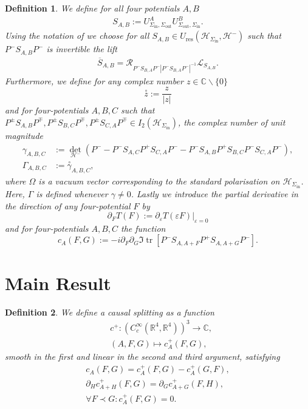 \documentclass[a4paper,11pt]{article}
\newtheorem{de}{Definition}
\DeclareMathOperator{\tr}{tr}
\begin{document}
\begin{de}
We define for all four potentials \(A,B \)
\begin{align}
S_{A,B}:=U^{A}_{\Sigma_{\mathrm{in}},\Sigma_{\mathrm{out}}}U^{B}_{\Sigma_{\mathrm{out}},\Sigma_{\mathrm{in}}}.
\end{align}
Using the notation of \cite{ivp0,ivp2} we choose for all \(S_{A,B}\in U_{\mathrm{res}}(\mathcal{H}_{\Sigma_{\mathrm{in}}},\mathcal{H}^-)\)
such that \(P^- S_{A,B}P^-\) is invertible the lift
\begin{align}
\overline{S}_{A,B}=\mathcal{R}_{P^- S_{B,A}P^- |P^- S_{B,A}P^-|^{-1}} \mathcal{L}_{S_{A,B}}.
\end{align}
Furthermore, we define for any complex number \(z\in \mathbb{C}\backslash \{0\}\)
\begin{equation}
\overset{\circ}{z}:=\frac{z}{|z|}
\end{equation}
and for four-potentials \(A,B,C\) such that \(P^{\pm} S_{A,B}P^{\mp},P^{\pm} S_{B,C}P^{\mp},P^{\pm} S_{C,A}P^{\mp}\in I_2(\mathcal{H}_{\Sigma_{\mathrm{in}}})\),
 the complex number of unit magnitude
\begin{align}
\gamma_{A,B,C}&:=\det_{\mathcal{H}^-}(P^--P^-S_{A,C}P^+S_{C,A}P^- - P^- S_{A,B} P^+ S_{B,C} P^- S_{C,A} P^-),\\
\Gamma_{A,B,C}&:=\overset{\circ}{\gamma}_{A,B,C},
\end{align}
where \(\Omega\) is a vacuum vector corresponding to the standard polarisation on \(\mathcal{H}_{{\Sigma}_{\mathrm{in}}}\).
Here, \(\Gamma\) is defined whenever \(\gamma\neq 0\).
Lastly we introduce the partial derivative in the direction of any four-potential \(F\) by
\begin{equation}
\partial_F T(F):=\partial_{\varepsilon}T(\varepsilon F)|_{\varepsilon =0}
\end{equation}
and for four-potentials \(A,B,C\) the function
\begin{equation}
c_A(F,G):=-i \partial_F \partial_G  \Im \tr [P^- S_{A,A+F} P^+ S_{A,A+G} P^-] .
\end{equation}
\end{de}

\section{Main Result}


\begin{de}
We define a causal splitting as a function 
\begin{align}
&c^+:(C_c^\infty(\mathbb{R}^4,\mathbb{R}^4))^3\rightarrow \mathbb{C}, \\
&(A,F,G)\mapsto c_A^+(F,G),
\end{align}
smooth in the first and linear in the second and third argument, satisfying
\begin{align}\label{c+ 1}
c_A(F,G)=c_A^+(F,G)-c_A^+(G,F),\\\label{c+ 2}
\partial_H c^+_{A+H}(F,G)=\partial_G c^+_{A+G}(F,H),\\\label{c+ 3}
\forall F \prec G: c_A^+(F,G)=0.
\end{align}
\end{de}
\end{document}
